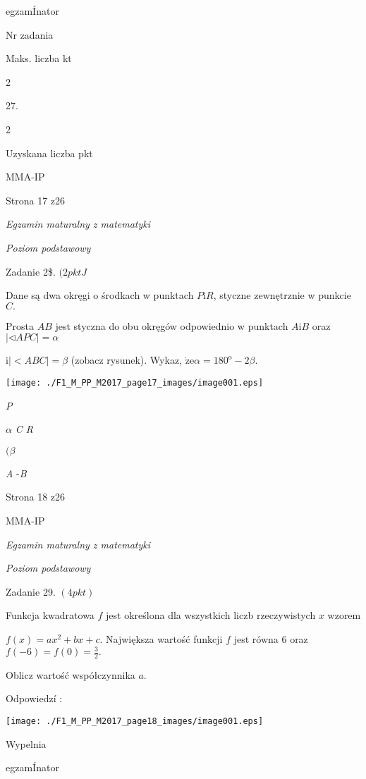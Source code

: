 \documentclass[a4paper,12pt]{article}
\begin{document}
egzamÍnator

Nr zadania

Maks. liczba kt

2

27.

2

Uzyskana liczba pkt

MMA-IP

Strona 17 z26





{\it Egzamin maturalny z matematyki}

{\it Poziom podstawowy}

Zadanie 2{\$}. $(2pktJ$

Dane są dwa okręgi o środkach w punktach $P \mathrm{i} R$, styczne zewnętrznie w punkcie $C.$

Prosta $AB$ jest styczna do obu okręgów odpowiednio w punktach $A \mathrm{i}B$ oraz $|\triangleleft APC|=\alpha$

$\mathrm{i}|<ABC|=\beta$ (zobacz rysunek). Wykaz, $\dot{\mathrm{z}}\mathrm{e}\alpha=180^{\mathrm{o}}-2\beta.$
\begin{center}
\texttt{[image: ./F1\_M\_PP\_M2017\_page17\_images/image001.eps]}
\end{center}
{\it P}

$\alpha$  {\it C  R}

$(\beta$

{\it A}  -{\it B}

Strona 18 z26

MMA-IP





{\it Egzamin maturalny z matematyki}

{\it Poziom podstawowy}

Zadanie 29. $(4pkt)$

Funkcja kwadratowa $f$ jest określona dla wszystkich liczb rzeczywistych $x$ wzorem

$f(x)=ax^{2}+bx+c$. Największa wartość funkcji $f$ jest równa 6 oraz $f(-6)=f(0)=\displaystyle \frac{3}{2}.$

Oblicz wartość współczynnika $a.$

Odpowiedzí :
\begin{center}
\texttt{[image: ./F1\_M\_PP\_M2017\_page18\_images/image001.eps]}
\end{center}
Wypelnia

egzamÍnator
\end{document}
